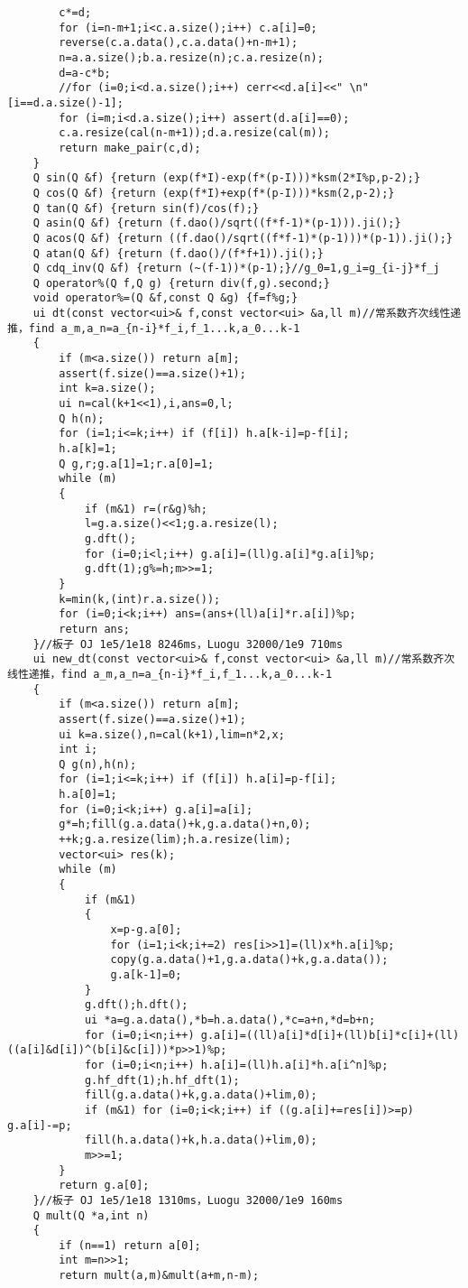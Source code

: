 \documentclass{ctexart}
\begin{document}
\begin{lstlisting}
		c*=d;
		for (i=n-m+1;i<c.a.size();i++) c.a[i]=0;
		reverse(c.a.data(),c.a.data()+n-m+1);
		n=a.a.size();b.a.resize(n);c.a.resize(n);
		d=a-c*b;
		//for (i=0;i<d.a.size();i++) cerr<<d.a[i]<<" \n"[i==d.a.size()-1];
		for (i=m;i<d.a.size();i++) assert(d.a[i]==0);
		c.a.resize(cal(n-m+1));d.a.resize(cal(m));
		return make_pair(c,d);
	}
	Q sin(Q &f) {return (exp(f*I)-exp(f*(p-I)))*ksm(2*I%p,p-2);}
	Q cos(Q &f) {return (exp(f*I)+exp(f*(p-I)))*ksm(2,p-2);}
	Q tan(Q &f) {return sin(f)/cos(f);}
	Q asin(Q &f) {return (f.dao()/sqrt((f*f-1)*(p-1))).ji();}
	Q acos(Q &f) {return ((f.dao()/sqrt((f*f-1)*(p-1)))*(p-1)).ji();}
	Q atan(Q &f) {return (f.dao()/(f*f+1)).ji();}
	Q cdq_inv(Q &f) {return (~(f-1))*(p-1);}//g_0=1,g_i=g_{i-j}*f_j
	Q operator%(Q f,Q g) {return div(f,g).second;}
	void operator%=(Q &f,const Q &g) {f=f%g;}
	ui dt(const vector<ui>& f,const vector<ui> &a,ll m)//常系数齐次线性递推，find a_m,a_n=a_{n-i}*f_i,f_1...k,a_0...k-1
	{
		if (m<a.size()) return a[m];
		assert(f.size()==a.size()+1);
		int k=a.size();
		ui n=cal(k+1<<1),i,ans=0,l;
		Q h(n);
		for (i=1;i<=k;i++) if (f[i]) h.a[k-i]=p-f[i];
		h.a[k]=1;
		Q g,r;g.a[1]=1;r.a[0]=1;
		while (m)
		{
			if (m&1) r=(r&g)%h;
			l=g.a.size()<<1;g.a.resize(l);
			g.dft();
			for (i=0;i<l;i++) g.a[i]=(ll)g.a[i]*g.a[i]%p;
			g.dft(1);g%=h;m>>=1;
		}
		k=min(k,(int)r.a.size());
		for (i=0;i<k;i++) ans=(ans+(ll)a[i]*r.a[i])%p;
		return ans;
	}//板子 OJ 1e5/1e18 8246ms，Luogu 32000/1e9 710ms
	ui new_dt(const vector<ui>& f,const vector<ui> &a,ll m)//常系数齐次线性递推，find a_m,a_n=a_{n-i}*f_i,f_1...k,a_0...k-1
	{
		if (m<a.size()) return a[m];
		assert(f.size()==a.size()+1);
		ui k=a.size(),n=cal(k+1),lim=n*2,x;
		int i;
		Q g(n),h(n);
		for (i=1;i<=k;i++) if (f[i]) h.a[i]=p-f[i];
		h.a[0]=1;
		for (i=0;i<k;i++) g.a[i]=a[i];
		g*=h;fill(g.a.data()+k,g.a.data()+n,0);
		++k;g.a.resize(lim);h.a.resize(lim);
		vector<ui> res(k);
		while (m)
		{
			if (m&1)
			{
				x=p-g.a[0];
				for (i=1;i<k;i+=2) res[i>>1]=(ll)x*h.a[i]%p;
				copy(g.a.data()+1,g.a.data()+k,g.a.data());
				g.a[k-1]=0;
			}
			g.dft();h.dft();
			ui *a=g.a.data(),*b=h.a.data(),*c=a+n,*d=b+n;
			for (i=0;i<n;i++) g.a[i]=((ll)a[i]*d[i]+(ll)b[i]*c[i]+(ll)((a[i]&d[i])^(b[i]&c[i]))*p>>1)%p;
			for (i=0;i<n;i++) h.a[i]=(ll)h.a[i]*h.a[i^n]%p;
			g.hf_dft(1);h.hf_dft(1);
			fill(g.a.data()+k,g.a.data()+lim,0);
			if (m&1) for (i=0;i<k;i++) if ((g.a[i]+=res[i])>=p) g.a[i]-=p;
			fill(h.a.data()+k,h.a.data()+lim,0);
			m>>=1;
		}
		return g.a[0];
	}//板子 OJ 1e5/1e18 1310ms，Luogu 32000/1e9 160ms
	Q mult(Q *a,int n)
	{
		if (n==1) return a[0];
		int m=n>>1;
		return mult(a,m)&mult(a+m,n-m);

\end{lstlisting}
\end{document}
